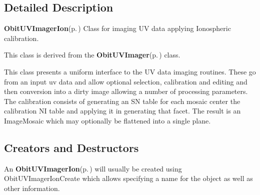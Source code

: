 \subsection{Detailed Description}
{\bf Obit\-UVImager\-Ion}{\rm (p.\,\pageref{structObitUVImagerIon})} Class for imaging UV data applying Ionospheric calibration. 

This class is derived from the {\bf Obit\-UVImager}{\rm (p.\,\pageref{structObitUVImager})} class.

This class presents a uniform interface to the UV data imaging routines. These go from an input uv data and allow optional selection, calibration and editing and then conversion into a dirty image allowing a number of processing parameters. The calibration consists of generating an SN table for each mosaic center the calibration NI table and applying it in generating that facet. The result is an Image\-Mosaic which may optionally be flattened into a single plane.\subsection{Creators and Destructors}\label{ObitUVImagerIon_8h_ObitUVImagerIonaccess}
An {\bf Obit\-UVImager\-Ion}{\rm (p.\,\pageref{structObitUVImagerIon})} will usually be created using Obit\-UVImager\-Ion\-Create which allows specifying a name for the object as well as other information.

